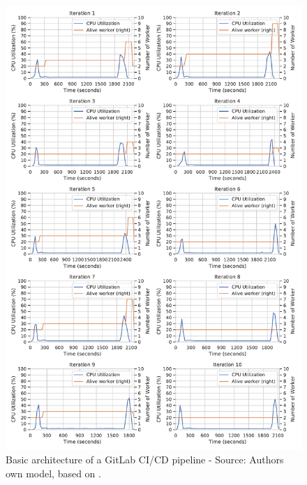 \begin{figure}[h]
\centering
\includegraphics[scale=0.53]{images/07_evaluation/mortgage/mortgage_auto-scaler_performance}
\caption{Basic architecture of a GitLab CI/CD pipeline - Source: Authors own model, based on \cite{Gitlab2020Docs}.}
\label{fig:07_mortgage_static-cpu_results}
\end{figure}
